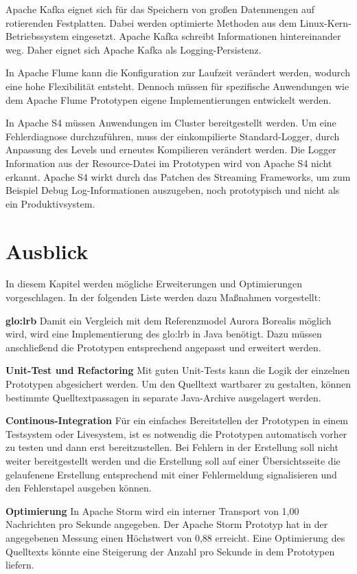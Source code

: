 Apache Kafka eignet sich für das Speichern von großen Datenmengen auf rotierenden Festplatten. Dabei werden optimierte Methoden aus dem Linux-Kern-Betriebssystem eingesetzt. Apache Kafka schreibt Informationen hintereinander weg. Daher eignet sich Apache Kafka als Logging-Persistenz.

In Apache Flume kann die Konfiguration zur Laufzeit verändert werden, wodurch eine hohe Flexibilität entsteht. Dennoch müssen für spezifische Anwendungen wie dem Apache Flume Prototypen eigene Implementierungen entwickelt werden. 

In Apache S4 müssen Anwendungen im Cluster bereitgestellt werden. Um eine Fehlerdiagnose durchzuführen, muss der einkompilierte Standard-Logger, durch Anpassung des Levels und erneutes Kompilieren verändert werden. Die Logger Information aus der Resource-Datei im Prototypen wird von Apache S4 nicht erkannt. Apache S4 wirkt durch das Patchen des Streaming Frameworks, um zum Beispiel Debug Log-Informationen auszugeben, noch prototypisch und nicht als ein Produktivsystem.


\section{Ausblick}

In diesem Kapitel werden mögliche Erweiterungen und Optimierungen vorgeschlagen. In der folgenden Liste werden dazu Maßnahmen  vorgestellt:

\textbf{\gls{glo:lrb}}
Damit ein Vergleich mit dem Referenzmodel Aurora Borealis möglich wird, wird eine Implementierung des \gls{glo:lrb} in Java benötigt. Dazu müssen anschließend die Prototypen entsprechend angepasst und erweitert werden.

\textbf{Unit-Test und Refactoring}
Mit guten Unit-Tests kann die Logik der einzelnen Prototypen abgesichert werden. Um den Quelltext wartbarer zu gestalten, können bestimmte Quelltextpassagen in separate Java-Archive ausgelagert werden.

\textbf{Continous-Integration}
Für ein einfaches Bereitstellen der Prototypen in einem Testsystem oder Livesystem, ist es notwendig die Prototypen automatisch vorher zu testen und dann erst bereitzustellen. Bei Fehlern in der Erstellung soll nicht weiter bereitgestellt werden und die Erstellung soll auf einer Übersichtsseite die gelaufenene Erstellung entsprechend mit einer Fehlermeldung signalisieren und den Fehlerstapel ausgeben können.

\textbf{Optimierung}
In Apache Storm wird ein interner Transport von 1,00 Nachrichten pro Sekunde angegeben. Der Apache Storm Prototyp hat in der angegebenen Messung einen Höchstwert von 0,88 erreicht. Eine Optimierung des Quelltexts könnte eine Steigerung der Anzahl pro Sekunde in dem Prototypen liefern.

